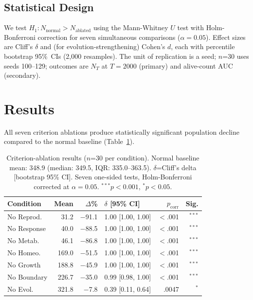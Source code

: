 \documentclass[letterpaper]{article}
\begin{document}
\subsection{Statistical Design}

We test $H_1: N_{\text{normal}} > N_{\text{ablated}}$ using the Mann-Whitney
$U$ test \citep{mann_1947_test} with Holm-Bonferroni correction
\citep{holm_1979_simple} for seven simultaneous comparisons ($\alpha=0.05$).
Effect sizes are Cliff's $\delta$ \citep{cliff_1993_dominance} and (for
evolution-strengthening) Cohen's $d$, each with percentile bootstrap 95\%~CIs
(2,000 resamples). The unit of replication is a seed; $n$=30 uses seeds
100--129; outcomes are $N_T$ at $T{=}2000$ (primary) and alive-count AUC
(secondary).

\section{Results}

All seven criterion ablations produce statistically significant population
decline compared to the normal baseline (Table~\ref{tab:ablation}).

\begin{table}[t]
\centering
\caption{Criterion-ablation results ($n$=30 per condition).
Normal baseline mean: 348.9 (median: 349.5, IQR: 335.0--363.5).
$\delta$=Cliff's delta [bootstrap 95\% CI].
Seven one-sided tests, Holm-Bonferroni corrected at $\alpha=0.05$.
$^{***}p < 0.001$, $^{*}p < 0.05$.}
\label{tab:ablation}
\small
\begin{tabular}{@{}lr@{\hskip 4pt}r@{\hskip 4pt}l@{\hskip 4pt}r@{\hskip 4pt}r@{}}
\toprule
Condition & Mean & $\Delta$\% & $\delta$ [95\% CI] & $p_{\text{corr}}$ & Sig. \\
\midrule
No Reprod.  & 31.2 & $-$91.1 & 1.00 [1.00, 1.00] & $<$.001 & $^{***}$ \\
No Response & 40.0 & $-$88.5 & 1.00 [1.00, 1.00] & $<$.001 & $^{***}$ \\
No Metab.   & 46.1 & $-$86.8 & 1.00 [1.00, 1.00] & $<$.001 & $^{***}$ \\
No Homeo.   & 169.0 & $-$51.5 & 1.00 [1.00, 1.00] & $<$.001 & $^{***}$ \\
No Growth   & 188.8 & $-$45.9 & 1.00 [1.00, 1.00] & $<$.001 & $^{***}$ \\
No Boundary & 226.7 & $-$35.0 & 0.99 [0.98, 1.00] & $<$.001 & $^{***}$ \\
No Evol.    & 321.8 & $-$7.8  & 0.39 [0.11, 0.64] & .0047 & $^{*}$ \\
\bottomrule
\end{tabular}
\end{table}
\end{document}
